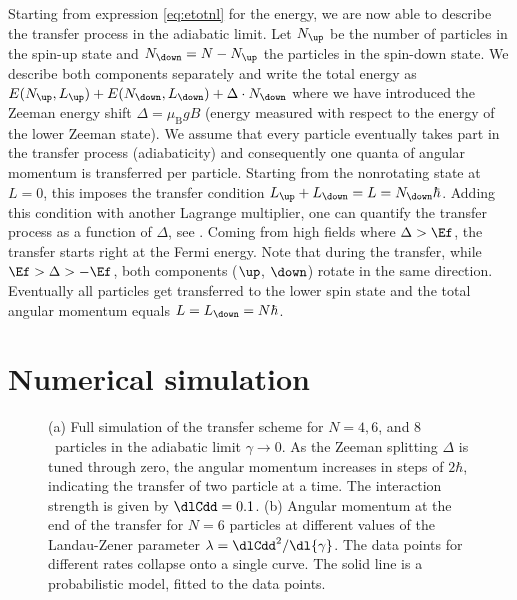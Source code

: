 Starting from expression \eqref{eq:etotnl} for the energy, we are now able to describe the transfer process in the adiabatic limit. Let $N_\up$ be the number of particles in the spin-up state and $N_\down = N-N_\up$ the particles in the spin-down state. We describe both components separately and write the total energy as
$E(N_\up,L_\up) + E(N_\down,L_\down) + \Delta\cdot N_\down$
where we have introduced the Zeeman energy shift $\Delta=\mu_\text{B} g B$ (energy measured with respect to the energy of the lower Zeeman state). We assume that every particle eventually takes part in the transfer process (adiabaticity) and consequently one quanta of angular momentum is transferred per particle. Starting from the nonrotating state at $L=0$, this imposes the transfer condition $L_\up + L_\down = L = N_\down\hbar$. Adding this condition with another Lagrange multiplier, one can quantify the transfer process as a function of $\Delta$, see . Coming from high fields where $\Delta > \Ef$, the transfer starts right at the Fermi energy. Note that during the transfer, while $\Ef > \Delta > -\Ef$, both components ($\up$, $\down$) rotate in the same direction. Eventually all particles get transferred to the lower spin state and the total angular momentum equals $L=L_\down=N\hbar$.

\section{Numerical simulation}
\begin{figure}[t]
    \centering
    \caption{\label{fig:fig3}(a) Full simulation of the transfer scheme for $N=4,6$, and $8$~particles in the adiabatic limit $\gamma\rightarrow 0$. As the Zeeman splitting $\Delta$ is tuned through zero, the angular momentum increases in steps of $2\hbar$, indicating the transfer of two particle at a time. The interaction strength is given by $\dlCdd=0.1$. (b) Angular momentum at the end of the transfer for $N=6$ particles at different values of the Landau-Zener parameter $\lambda=\dlCdd^2/\dl{\gamma}$. The data points for different rates collapse onto a single curve. The solid line is a probabilistic model, fitted to the data points.}
\end{figure}

